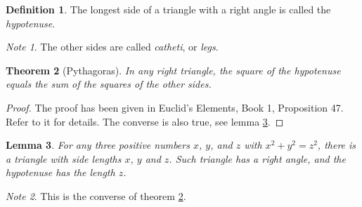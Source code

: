 \documentclass{article}
\newtheorem{thm}{Theorem}
\newtheorem{lem}[thm]{Lemma}
\theoremstyle{definition}
\newtheorem{dfn}[thm]{Definition}
\theoremstyle{remark}
\newtheorem*{note}{Note}
\begin{document}
\begin{dfn}
  The longest side of a triangle with a right angle
  is called the \emph{hypotenuse}.
\end{dfn}
\begin{note}
  The other sides are called \emph{catheti},
  or \emph{legs}.
\end{note}
\begin{thm}[Pythagoras]
  \label{pythagoras}
  In any right triangle, the square of the hypotenuse
  equals the sum of the squares of the other sides.
\end{thm}
\begin{proof}
  The proof has been given in Euclid's Elements,
  Book 1, Proposition 47. Refer to it for details.
  The converse is also true, see lemma \ref{converse}.
\end{proof}
\begin{lem}
  \label{converse}
  For any three positive numbers \(x\), \(y\),
  and \(z\) with \(x^2 + y^2 = z^2\), there is a
  triangle with side lengths \(x\), \(y\) and \(z\).
  Such triangle has a right angle, and the hypotenuse
  has the length \(z\).
\end{lem}
\begin{note}
  This is the converse of theorem \ref{pythagoras}.
\end{note}
\end{document}
